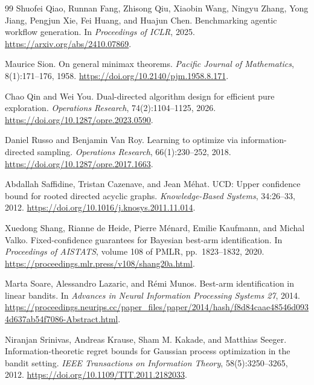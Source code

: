 \documentclass{article}
\theoremstyle{plain}
\theoremstyle{definition}
\begin{document}
\begin{thebibliography}{99}
Shuofei Qiao, Runnan Fang, Zhisong Qiu, Xiaobin Wang, Ningyu Zhang, Yong Jiang, Pengjun Xie, Fei Huang, and Huajun Chen.
Benchmarking agentic workflow generation.
In \emph{Proceedings of ICLR}, 2025.
\url{https://arxiv.org/abs/2410.07869}.

Maurice Sion.
On general minimax theorems.
\emph{Pacific Journal of Mathematics}, 8(1):171--176, 1958.
\url{https://doi.org/10.2140/pjm.1958.8.171}.

Chao Qin and Wei You.
Dual-directed algorithm design for efficient pure exploration.
\emph{Operations Research}, 74(2):1104--1125, 2026.
\url{https://doi.org/10.1287/opre.2023.0590}.

Daniel Russo and Benjamin Van Roy.
Learning to optimize via information-directed sampling.
\emph{Operations Research}, 66(1):230--252, 2018.
\url{https://doi.org/10.1287/opre.2017.1663}.

Abdallah Saffidine, Tristan Cazenave, and Jean M\'ehat.
UCD: Upper confidence bound for rooted directed acyclic graphs.
\emph{Knowledge-Based Systems}, 34:26--33, 2012.
\url{https://doi.org/10.1016/j.knosys.2011.11.014}.

Xuedong Shang, Rianne de Heide, Pierre M\'enard, Emilie Kaufmann, and Michal Valko.
Fixed-confidence guarantees for Bayesian best-arm identification.
In \emph{Proceedings of AISTATS}, volume 108 of PMLR, pp.\ 1823--1832, 2020.
\url{https://proceedings.mlr.press/v108/shang20a.html}.

Marta Soare, Alessandro Lazaric, and R\'emi Munos.
Best-arm identification in linear bandits.
In \emph{Advances in Neural Information Processing Systems 27}, 2014.
\url{https://proceedings.neurips.cc/paper_files/paper/2014/hash/f8d84caae48546d0934d637ab54f7086-Abstract.html}.

Niranjan Srinivas, Andreas Krause, Sham M. Kakade, and Matthias Seeger.
Information-theoretic regret bounds for Gaussian process optimization in the bandit setting.
\emph{IEEE Transactions on Information Theory}, 58(5):3250--3265, 2012.
\url{https://doi.org/10.1109/TIT.2011.2182033}.


\end{thebibliography}
\end{document}
